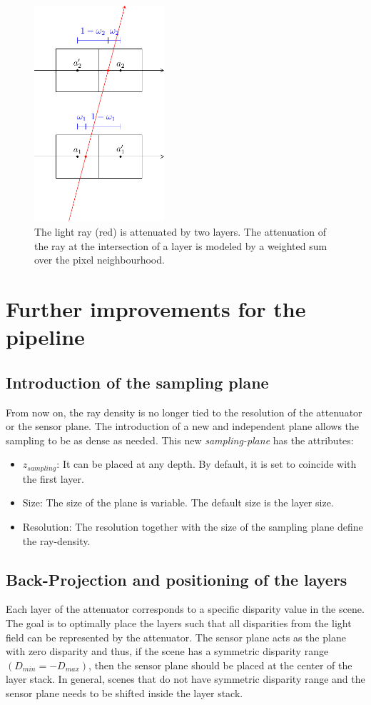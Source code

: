 \documentclass[11pt,a4paper,titlepage]{article}
\begin{document}
\begin{figure}
	\centering
	\includegraphics[height=8cm]{sketches/ray_space_interpolation.pdf}
	\caption{The light ray (red) is attenuated by two layers. The attenuation of the ray at the intersection of a layer is modeled by a weighted sum over the pixel neighbourhood.}
	\label{fig:problem_with_ray_space_interpolation}
\end{figure}

\clearpage
\section{Further improvements for the pipeline}
\subsection{Introduction of the sampling plane}
From now on, the ray density is no longer tied to the resolution of the attenuator or the sensor plane. The introduction of a new and independent plane allows the sampling to be as dense as needed. This new \emph{sampling-plane} has the attributes:

\begin{itemize}
	\item	$z_{sampling}$: It can be placed at any depth. By default, it is set to coincide with the first layer.
	\item	Size: The size of the plane is variable. The default size is the layer size.
	\item	Resolution: The resolution together with the size of the sampling plane define the ray-density.
\end{itemize}

\subsection{Back-Projection and positioning of the layers}
Each layer of the attenuator corresponds to a specific disparity value in the scene. The goal is to optimally place the layers such that all disparities from the light field can be represented by the attenuator. The sensor plane acts as the plane with zero disparity and thus, if the scene has a symmetric disparity range $\left(D_{min} = -D_{max}\right)$, then the sensor plane should be placed at the center of the layer stack. In general, scenes that do not have symmetric disparity range and the sensor plane needs to be shifted inside the  layer stack. 
\end{document}
